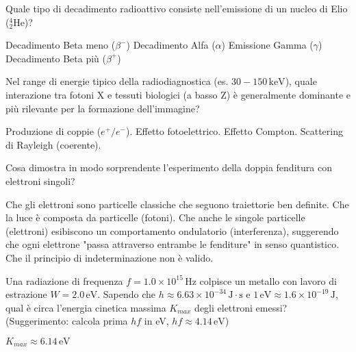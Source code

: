 \documentclass{exam}%
\begin{document}
\begin{questions}%
\question Quale tipo di decadimento radioattivo consiste nell'emissione di un nucleo di Elio ($^4_2\text{He}$)?%
\vspace{0.2em}%
\begin{multicols}{2}%
\begin{choices}%
\choice Decadimento Beta meno ($\beta^-$)%
\choice Decadimento Alfa ($\alpha$)%
\choice Emissione Gamma ($\gamma$)%
\choice Decadimento Beta più ($\beta^+$)%
\end{choices}%
\end{multicols}%
\question Nel range di energie tipico della radiodiagnostica (es. $30-150 \, \text{keV}$), quale interazione tra fotoni X e tessuti biologici (a basso Z) è generalmente dominante e più rilevante per la formazione dell'immagine?%
\vspace{0.2em}%
\begin{multicols}{2}%
\begin{choices}%
\choice Produzione di coppie ($e^+/e^-$).%
\choice Effetto fotoelettrico.%
\choice Effetto Compton.%
\choice Scattering di Rayleigh (coerente).%
\end{choices}%
\end{multicols}%
\question Cosa dimostra in modo sorprendente l'esperimento della doppia fenditura con elettroni singoli?%
\vspace{0.2em}%
\begin{choices}%
\choice Che gli elettroni sono particelle classiche che seguono traiettorie ben definite.%
\choice Che la luce è composta da particelle (fotoni).%
\choice Che anche le singole particelle (elettroni) esibiscono un comportamento ondulatorio (interferenza), suggerendo che ogni elettrone "passa attraverso entrambe le fenditure" in senso quantistico.%
\choice Che il principio di indeterminazione non è valido.%
\end{choices}%
\question Una radiazione di frequenza $f = 1.0 \times 10^{15} \, \text{Hz}$ colpisce un metallo con lavoro di estrazione $W = 2.0 \, \text{eV}$. Sapendo che $h \approx 6.63 \times 10^{-34} \, \text{J} \cdot \text{s}$ e $1 \, \text{eV} \approx 1.6 \times 10^{-19} \, \text{J}$, qual è circa l'energia cinetica massima $K_{max}$ degli elettroni emessi? (Suggerimento: calcola prima $hf$ in eV, $hf \approx 4.14 \, \text{eV}$)%
\vspace{0.2em}%
\begin{multicols}{4}%
\begin{choices}%
\choice $K_{max} \approx 6.14 \, \text{eV}$%

\end{choices}
\end{multicols}
\end{questions}
\end{document}

